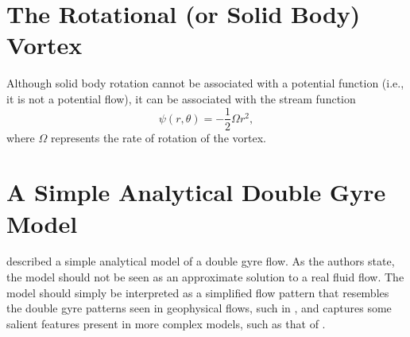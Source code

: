 \documentclass[10pt, twoside]{book}
\begin{document}
		\section{\label{sec:RotVortex}The Rotational (or Solid Body) Vortex}
			
			Although solid body rotation cannot be associated with a potential function (i.e., it is not a potential flow), it can be associated with the stream function
			\begin{equation}
			\label{eq:RotVortexStreamPol}
				\psi\left(r,\theta\right) = -\frac{1}{2}\Omega r^2,
			\end{equation}
			where $\Omega$ represents the rate of rotation of the vortex.
			
		\section{\label{sec:DoubleGyre}A Simple Analytical Double Gyre Model}
			
			\citet{Shadden05} described a simple analytical model of a double gyre flow. As the authors state, the model should not be seen as an approximate solution to a real fluid flow. The model should simply be interpreted as a simplified flow pattern that resembles the double gyre patterns seen in geophysical flows, such in \citet{Coulliette07}, and captures some salient features present in more complex models, such as that of \citet{Coulliette00,Coulliette01}.
			
\end{document}
